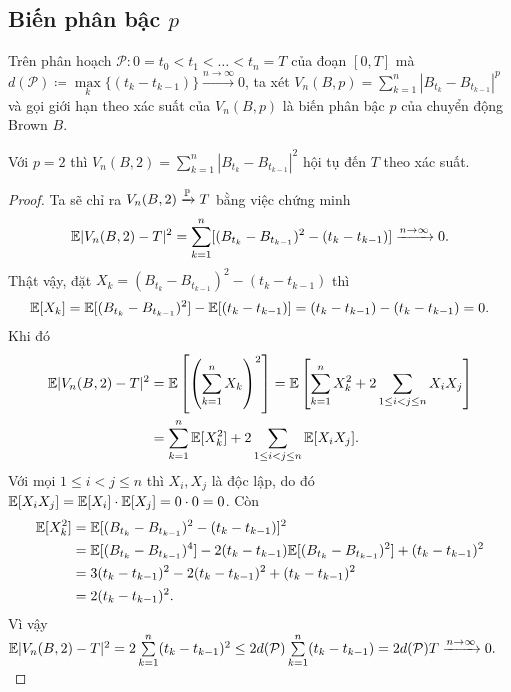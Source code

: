 \subsection{Biến phân bậc $p$}
\begin{defn}
    Trên phân hoạch $\mathcal{P}: 0=t_0<t_1<\ldots<t_n=T$ của đoạn $[0,T]$ mà $d(\mathcal{P})\coloneqq \max\limits_{k}\{(t_k-t_{k-1})\}\xrightarrow[]{n\to \infty} 0$, ta xét $V_n(B,p) = \sum\limits_{k=1}^{n}|B_{t_k}-B_{t_{k-1}}|^p$ và gọi giới hạn theo xác suất của $V_n(B,p)$ là biến phân bậc $p$ của chuyển động Brown $B$.
\end{defn}
\begin{prop}
    Với $p=2$ thì $V_n(B,2) = \sum\limits_{k=1}^{n}|B_{t_k}-B_{t_{k-1}}|^2$ hội tụ đến $T$ theo xác suất.
\end{prop}
\begin{proof}
Ta sẽ chỉ ra $V_n(B,2)\xrightarrow[]{\mathbb{P}} T$ bằng việc chứng minh \[\mathbb{E}|V_n(B,2)-T|^2=\sum\limits_{k=1}^{n}[(B_{t_k}-B_{t_{k-1}})^2-(t_k-t_{k-1})]\xrightarrow[]{n\to \infty} 0.\]
Thật vậy, đặt $X_k = (B_{t_k}-B_{t_{k-1}})^2-(t_k-t_{k-1})$ thì \[\mathbb{E}[X_k]=\mathbb{E}[(B_{t_k}-B_{t_{k-1}})^2]-\mathbb{E}[(t_k-t_{k-1})]=(t_k-t_{k-1})-(t_k-t_{k-1})=0.\]
Khi đó 
\begin{align*}
    \mathbb{E}|V_n(B,2)-T|^2 &= \mathbb{E}\left[\left(\sum\limits_{k=1}^{n}{X_k}\right)^2\right]=\mathbb{E}\left[\sum\limits_{k=1}^{n}{X_k^2} + 2\sum\limits_{1\leq i<j\leq n}{X_iX_j}\right]\\
    &= \sum\limits_{k=1}^{n}\mathbb{E}[{X_k^2}]+ 2\sum\limits_{1\leq i<j\leq n}\mathbb{E}[{X_iX_j}].
\end{align*}
Với mọi $1\leq i<j\leq n$ thì $X_i, X_j$ là độc lập, do đó $\mathbb{E}[{X_iX_j}] = \mathbb{E}[X_i]\cdot\mathbb{E}[X_j] = 0\cdot 0 = 0$. Còn
\begin{align*}
    \mathbb{E}[X_k^2]&=\mathbb{E}[(B_{t_k}-B_{t_{k-1}})^2-(t_k-t_{k-1})]^2\\
    &= \mathbb{E}[(B_{t_k}-B_{t_{k-1}})^4]-2(t_k-t_{k-1})\mathbb{E}[(B_{t_k}-B_{t_{k-1}})^2]+(t_k-t_{k-1})^2\\
    &= 3(t_k-t_{k-1})^2-2(t_k-t_{k-1})^2+(t_k-t_{k-1})^2\\
    &= 2(t_k-t_{k-1})^2.
\end{align*}
Vì vậy $\mathbb{E}|V_n(B,2)-T|^2 = 2\sum\limits_{k=1}^{n}(t_k-t_{k-1})^2\leq 2d(\mathcal{P})\sum\limits_{k=1}^{n}(t_k-t_{k-1})=2d(\mathcal{P})T\xrightarrow[]{n\to \infty} 0.$
\end{proof}
